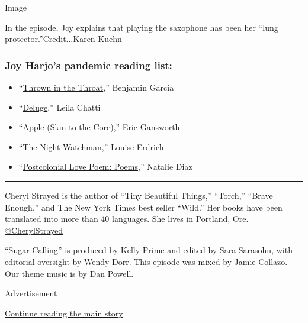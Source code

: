 Image

In the episode, Joy explains that playing the saxophone has been her
``lung protector.''Credit...Karen Kuehn

\hypertarget{joy-harjos-pandemic-reading-list}{%
\subsubsection{\texorpdfstring{\textbf{Joy Harjo's pandemic reading
list:}}{Joy Harjo's pandemic reading list:}}\label{joy-harjos-pandemic-reading-list}}

\begin{itemize}
\tightlist
\item
  ``\href{https://milkweed.org/book/thrown-in-the-throat}{Thrown in the
  Throat},'' Benjamin Garcia
\end{itemize}

\begin{itemize}
\item
  ``\href{https://www.coppercanyonpress.org/books/deluge-by-leila-chatti/}{Deluge},''
  Leila Chatti
\item
  ``\href{https://www.indiebound.org/book/9781646140138}{Apple (Skin to
  the Core)},'' Eric Gansworth
\item
  ``\href{https://www.harpercollins.com/9780062671189/the-night-watchman/}{The
  Night Watchman},'' Louise Erdrich
\item
  ``\href{https://www.graywolfpress.org/books/postcolonial-love-poem}{Postcolonial
  Love Poem: Poems},'' Natalie Diaz
\end{itemize}

\begin{center}\rule{0.5\linewidth}{\linethickness}\end{center}

Cheryl Strayed is the author of ``Tiny Beautiful Things,'' ``Torch,''
``Brave Enough,'' and The New York Times best seller ``Wild.'' Her books
have been translated into more than 40 languages. She lives in Portland,
Ore.
\href{https://twitter.com/CherylStrayed?ref_src=twsrc\%5Egoogle\%7Ctwcamp\%5Eserp\%7Ctwgr\%5Eauthor}{@CherylStrayed}

``Sugar Calling'' is produced by Kelly Prime and edited by Sara
Sarasohn, with editorial oversight by Wendy Dorr. This episode was mixed
by Jamie Collazo. Our theme music is by Dan Powell.

Advertisement

\protect\hyperlink{after-bottom}{Continue reading the main story}

